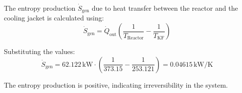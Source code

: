 The entropy production \( \dot{S}_{\text{gen}} \) due to heat transfer between the reactor and the cooling jacket is calculated using:  
\[
\dot{S}_{\text{gen}} = \dot{Q}_{\text{out}} \left( \frac{1}{T_{\text{Reactor}}} - \frac{1}{T_{\text{KF}}} \right)
\]  

Substituting the values:  
\[
\dot{S}_{\text{gen}} = 62.122 \, \text{kW} \cdot \left( \frac{1}{373.15} - \frac{1}{253.121} \right) = 0.04615 \, \text{kW/K}
\]  

The entropy production is positive, indicating irreversibility in the system.